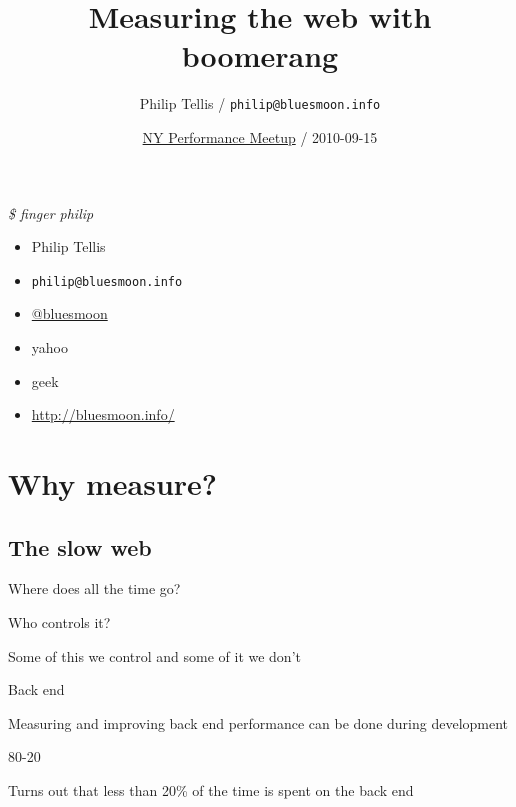 \documentclass{beamer}
\author{Philip Tellis / \texttt{philip@bluesmoon.info}}
\title{Measuring the web with boomerang}
\date{\href{http://www.meetup.com/Web-Performance-NY/calendar/14568561/}{NY Performance Meetup} / 2010-09-15}
\begin{document}
\begin{frame}
  \titlepage
\end{frame}


\begin{frame}{\textit{\$ finger philip}}
  \begin{itemize}
  \item Philip Tellis
  \item \small{\texttt{philip@bluesmoon.info}}
  \item \href{http://twitter.com/bluesmoon}{@bluesmoon}
  \item yahoo
  \item geek
  \item \href{http://bluesmoon.info/}{http://bluesmoon.info/}
  \end{itemize}
\end{frame}


\section{Why measure?}
\subsection{The slow web}

\begin{frame}{Where does all the time go?}
\end{frame}

\begin{frame}{Who controls it?}
  \begin{center}
  Some of this we control and some of it we don't
  \end{center}
\end{frame}

\begin{frame}{Back end}
  \begin{center}
  Measuring and improving back end performance can be done during development
  \end{center}
\end{frame}

\begin{frame}{80-20}
  \begin{center}
  Turns out that less than 20\% of the time is spent on the back end
  \end{center}
\end{frame}
\end{document}
